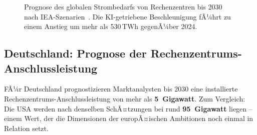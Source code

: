 ﻿\documentclass[12pt, a4paper, openany]{report}
\begin{document}
\begin{figure}[H]
	\centering
	\caption{Prognose des globalen Strombedarfs von Rechenzentren bis 2030
		nach IEA-Szenarien~\cite{iea2024}. Die KI-getriebene Beschleunigung
		fÃ¼hrt zu einem Anstieg um mehr als 530\,TWh gegenÃ¼ber 2024.}
	\label{fig:iea_prognose}
\end{figure}

\subsection{Deutschland: Prognose der Rechenzentrums-Anschluss\-leistung}

FÃ¼r Deutschland prognostizieren Marktanalysten bis 2030 eine installierte
Rechenzentrums-Anschlussleistung von mehr als \textbf{5~Gigawatt}. Zum
Vergleich: Die USA werden nach denselben SchÃ¤tzungen bei rund
\textbf{95~Gigawatt} liegen -- einem Wert, der die Dimensionen der
europÃ¤ischen Ambitionen noch einmal in Relation setzt.
\end{document}

